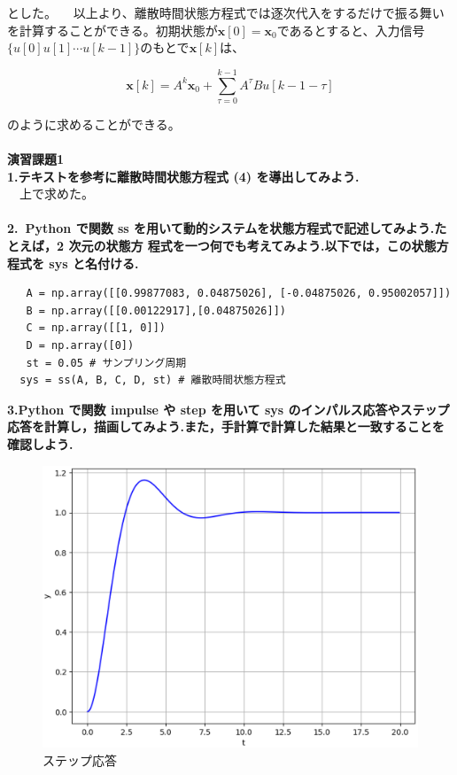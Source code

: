 \documentclass[a4paper,10.5pt]{ltjsarticle}
\begin{document}
とした。
　以上より、離散時間状態方程式では逐次代入をするだけで振る舞いを計算することができる。初期状態が$\bm x[0]=\bm x_0$であるとすると、入力信号$\{u[0]u[1]\cdots u[k-1]\}$のもとで$\bm x[k]$は、

\begin{equation}
  \bm x[k]=A^k\bm x_0+\sum^{k-1}_{\tau=0}A^{\tau}Bu[k-1-\tau]
\end{equation}

のように求めることができる。\\
\\
{\Large \bfseries 演習課題1}\\
{\large \bfseries 1.テキストを参考に離散時間状態方程式 (4) を導出してみよう.}\\
　上で求めた。\\
\\
{\large \bfseries 2.\ Python で関数 ss を用いて動的システムを状態方程式で記述してみよう.たとえば，2 次元の状態方
程式を一つ何でも考えてみよう.以下では，この状態方程式を sys と名付ける.}\\

\begin{lstlisting}
   A = np.array([[0.99877083, 0.04875026], [-0.04875026, 0.95002057]])
   B = np.array([[0.00122917],[0.04875026]])
   C = np.array([[1, 0]])
   D = np.array([0])
   st = 0.05 # サンプリング周期
  sys = ss(A, B, C, D, st) # 離散時間状態方程式
\end{lstlisting}

{\large \bfseries 3.Python で関数 impulse や step を用いて sys のインパルス応答やステップ応答を計算し，描画してみよう.また，手計算で計算した結果と一致することを確認しよう.}\\

\begin{figure}[h]
  \centering
  \includegraphics[scale=0.5]{figure2.eps}
  \caption{ステップ応答}
\end{figure}
\end{document}
